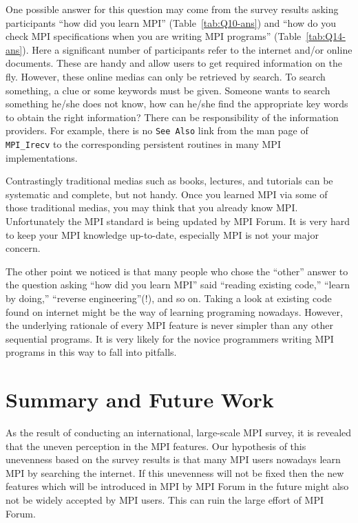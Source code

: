 \documentclass[sigconf,nonacm]{acmart}
\begin{document}
One possible answer for this question may come from the survey results
asking participants ``how did you learn MPI''
(Table~\ref{tab:Q10-ans}) and ``how do you check
MPI specifications when you are writing MPI programs''
(Table~\ref{tab:Q14-ans}). 
Here a significant number of participants refer to the internet
and/or online documents. These are handy and allow users to get
required information on the fly. However, 
these online medias can only be retrieved by
search. To search something, a clue or some keywords must be given. 
Someone wants to search something he/she does not know, how can he/she
find the appropriate key words to obtain the right information? 
There can be responsibility of the information providers. For example,
there is no {\tt See Also} link from the man page of {\tt MPI\_Irecv}
to the corresponding persistent routines in many MPI implementations. 

Contrastingly traditional medias such as books, lectures, and tutorials can be
systematic and complete, but not handy.  Once you learned MPI via some
of those traditional medias, you may think that you already know
MPI. Unfortunately the MPI standard is being updated by MPI Forum. It is
very hard to keep your MPI knowledge up-to-date, especially MPI is not
your major concern. 

The other point we noticed is that many people who chose the ``other''
answer to the question asking ``how did you learn MPI'' said
``reading existing code,'' ``learn by doing,'' ``reverse
engineering''(!),  and so on. Taking a look at existing code found on
internet might be the way of learning programing nowadays. However,
the underlying rationale of every MPI feature is never simpler than
any other sequential programs. It is very likely for the novice
programmers writing MPI programs in this way to fall into pitfalls. 

\section{Summary and Future Work}

As the result of conducting an international, large-scale MPI survey,
it is revealed that the uneven perception in the MPI features. Our
hypothesis of this unevenness based on the survey results is that many 
MPI users nowadays learn MPI by searching the internet. If this
unevenness will not be fixed then the new features which will be
introduced in MPI by MPI Forum in the future might also not be
widely accepted by MPI users. This can ruin the large effort of MPI
Forum. 
\end{document}

